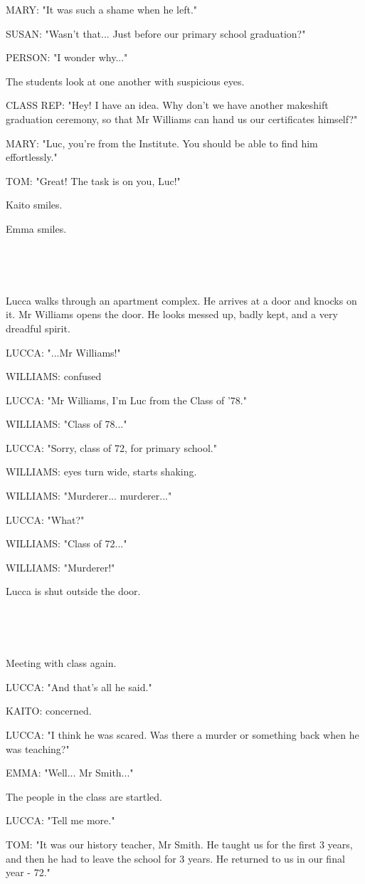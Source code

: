 \documentclass[11pt]{article}
\begin{document}
MARY: "It was such a shame when he left."

SUSAN: "Wasn't that... Just before our primary school graduation?"

PERSON: "I wonder why..."

The students look at one another with suspicious eyes.

CLASS REP: "Hey! I have an idea. 
Why don't we have another makeshift graduation ceremony, so that Mr Williams can hand us our certificates himself?"

MARY: "Luc, you're from the Institute. 
You should be able to find him effortlessly."

TOM: "Great! The task is on you, Luc!"

Kaito smiles.

Emma smiles.

\ 

\ 

Lucca walks through an apartment complex. 
He arrives at a door and knocks on it.
Mr Williams opens the door. 
He looks messed up, badly kept, and a very dreadful spirit.

LUCCA: "...Mr Williams!"

WILLIAMS: confused

LUCCA: "Mr Williams, I'm Luc from the Class of '78."

WILLIAMS: "Class of 78..."

LUCCA: "Sorry, class of 72, for primary school."

WILLIAMS: eyes turn wide, starts shaking.

WILLIAMS: "Murderer... murderer..."

LUCCA: "What?"

WILLIAMS: "Class of 72..."

WILLIAMS: "Murderer!"

Lucca is shut outside the door.

\ 

\ 

Meeting with class again. 

LUCCA: "And that's all he said."

KAITO: concerned.

LUCCA: "I think he was scared.
Was there a murder or something back when he was teaching?"

EMMA: "Well... Mr Smith..."

The people in the class are startled.

LUCCA: "Tell me more."

TOM: "It was our history teacher, Mr Smith.
He taught us for the first 3 years, and then he had to leave the school for 3 years.
He returned to us in our final year - 72."
\end{document}
